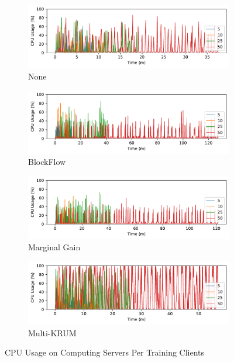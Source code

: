 \begin{figure}[!ht]
    \centering
    \begin{subfigure}[b]{0.49\textwidth}
        \centering
        \includegraphics[width=\textwidth]{graphics/clients/cpu_none_server.pdf}
        \caption{None}
    \end{subfigure}
    \hfill
    \begin{subfigure}[b]{0.49\textwidth}
        \centering
        \includegraphics[width=\textwidth]{graphics/clients/cpu_blockflow_server.pdf}
        \caption{BlockFlow}
    \end{subfigure}
    \hfill
    \begin{subfigure}[b]{0.49\textwidth}
        \centering
        \includegraphics[width=\textwidth]{graphics/clients/cpu_marginalgain_server.pdf}
        \caption{Marginal Gain}
    \end{subfigure}
    \hfill
    \begin{subfigure}[b]{0.49\textwidth}
        \centering
        \includegraphics[width=\textwidth]{graphics/clients/cpu_multikrum_server.pdf}
        \caption{Multi-KRUM}
    \end{subfigure}
    \caption{CPU Usage on Computing Servers Per Training Clients}
    \label{fig:cpu_clients_degree_server}
\end{figure}

